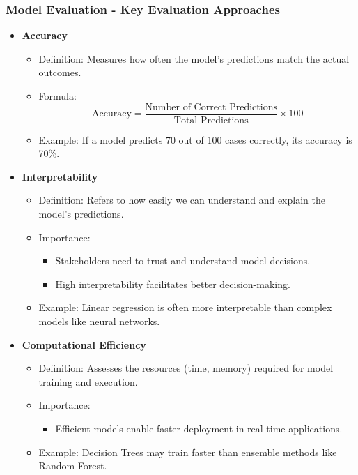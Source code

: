 \documentclass[aspectratio=169]{beamer}
\begin{document}
\begin{frame}[fragile]
    \frametitle{Model Evaluation - Key Evaluation Approaches}
    \begin{itemize}
        \item \textbf{Accuracy}
        \begin{itemize}
            \item Definition: Measures how often the model's predictions match the actual outcomes.
            \item Formula:
            \begin{equation}
            \text{Accuracy} = \frac{\text{Number of Correct Predictions}}{\text{Total Predictions}} \times 100
            \end{equation}
            \item Example: If a model predicts 70 out of 100 cases correctly, its accuracy is 70\%.
        \end{itemize}
        
        \item \textbf{Interpretability}
        \begin{itemize}
            \item Definition: Refers to how easily we can understand and explain the model's predictions.
            \item Importance:
            \begin{itemize}
                \item Stakeholders need to trust and understand model decisions.
                \item High interpretability facilitates better decision-making.
            \end{itemize}
            \item Example: Linear regression is often more interpretable than complex models like neural networks.
        \end{itemize}
        
        \item \textbf{Computational Efficiency}
        \begin{itemize}
            \item Definition: Assesses the resources (time, memory) required for model training and execution.
            \item Importance:
            \begin{itemize}
                \item Efficient models enable faster deployment in real-time applications.
            \end{itemize}
            \item Example: Decision Trees may train faster than ensemble methods like Random Forest.
        \end{itemize}
    \end{itemize}
\end{frame}
\end{document}
